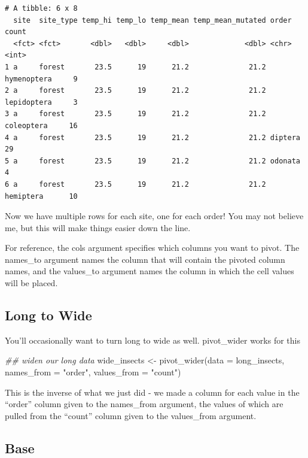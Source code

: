 \documentclass[
  letterpaper,
  DIV=11,
  numbers=noendperiod]{scrreprt}
\newenvironment{Shaded}{\begin{snugshade}}{\end{snugshade}}
\newcommand{\AttributeTok}[1]{\textcolor[rgb]{0.40,0.45,0.13}{#1}}
\newcommand{\DocumentationTok}[1]{\textcolor[rgb]{0.37,0.37,0.37}{\textit{#1}}}
\newcommand{\FunctionTok}[1]{\textcolor[rgb]{0.28,0.35,0.67}{#1}}
\newcommand{\NormalTok}[1]{\textcolor[rgb]{0.00,0.23,0.31}{#1}}
\newcommand{\OtherTok}[1]{\textcolor[rgb]{0.00,0.23,0.31}{#1}}
\newcommand{\StringTok}[1]{\textcolor[rgb]{0.13,0.47,0.30}{#1}}
\begin{document}
\begin{verbatim}
# A tibble: 6 x 8
  site  site_type temp_hi temp_lo temp_mean temp_mean_mutated order       count
  <fct> <fct>       <dbl>   <dbl>     <dbl>             <dbl> <chr>       <int>
1 a     forest       23.5      19      21.2              21.2 hymenoptera     9
2 a     forest       23.5      19      21.2              21.2 lepidoptera     3
3 a     forest       23.5      19      21.2              21.2 coleoptera     16
4 a     forest       23.5      19      21.2              21.2 diptera        29
5 a     forest       23.5      19      21.2              21.2 odonata         4
6 a     forest       23.5      19      21.2              21.2 hemiptera      10
\end{verbatim}

Now we have multiple rows for each site, one for each order! You may not
believe me, but this will make things easier down the line.

For reference, the cols argument specifies which columns you want to
pivot. The names\_to argument names the column that will contain the
pivoted column names, and the values\_to argument names the column in
which the cell values will be placed.

\subsection{Long to Wide}\label{long-to-wide}

You'll occasionally want to turn long to wide as well. pivot\_wider
works for this

\begin{Shaded}
\begin{Highlighting}[]
\DocumentationTok{\#\# widen our long data}
\NormalTok{wide\_insects }\OtherTok{\textless{}{-}} \FunctionTok{pivot\_wider}\NormalTok{(}\AttributeTok{data =}\NormalTok{ long\_insects,}
                            \AttributeTok{names\_from =} \StringTok{"order"}\NormalTok{,}
                            \AttributeTok{values\_from =} \StringTok{"count"}\NormalTok{)}
\end{Highlighting}
\end{Shaded}

This is the inverse of what we just did - we made a column for each
value in the ``order'' column given to the names\_from argument, the
values of which are pulled from the ``count'' column given to the
values\_from argument.

\subsection{Base}\label{base-1}
\end{document}
